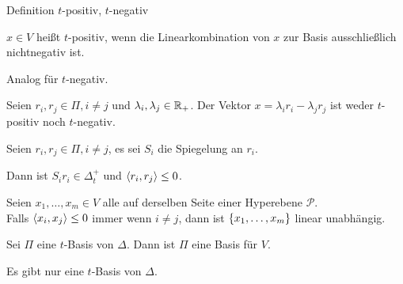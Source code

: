 \documentclass[18pt, handout]{beamer}
\begin{document}
\begin{frame}{Definition \(t\)-positiv, \( t \)-negativ}
    \begin{defi}
        \( x \in V \) heißt \(t\)-positiv, wenn 
        die Linearkombination von \(x\) zur 
        Basis ausschließlich nichtnegativ ist.

        Analog für \( t \)-negativ.
    \end{defi}
    \pause
    \begin{satz} %
        Seien \( r_i, r_j \in \Pi, i \neq j \) und 
        \( \lambda_i, \lambda_j \in \mathbb{R}_+ \). 
        Der Vektor \( x = \lambda_i r_i - \lambda_j r_j \) 
        ist weder \( t \)-positiv noch \( t \)-negativ.
    \end{satz}
\end{frame}

\begin{frame}
    \begin{satz} %
        
        Seien \( r_i, r_j \in \Pi, i \neq j \), es 
        sei \( S_i \) die Spiegelung an \( r_i \). 

        Dann ist \( S_i r_i \in \Delta_t^+ \) und 
        \( \langle r_i, r_j \rangle \leq 0 \).
    \end{satz}\pause

    \begin{satz} %
        Seien \( x_1, \ldots, x_m \in V \) alle auf derselben 
        Seite einer Hyperebene \( \mathscr{P} \). \\
        Falls \( \langle x_i, x_j \rangle \leq 0 \) immer wenn 
        \( i \neq j \), dann ist \( \{x_1, \ldots, x_m\} \) 
        linear unabhängig.
    \end{satz}
\end{frame}

\begin{frame}
    \begin{satz} %
        Sei \( \Pi \) eine \(t\)-Basis von \( \Delta \). Dann ist 
        \( \Pi \) eine Basis für \( V \).
    \end{satz}\pause
    \begin{satz} %
        Es gibt nur eine \( t \)-Basis von \( \Delta \).
    \end{satz}
\end{frame}
\end{document}
